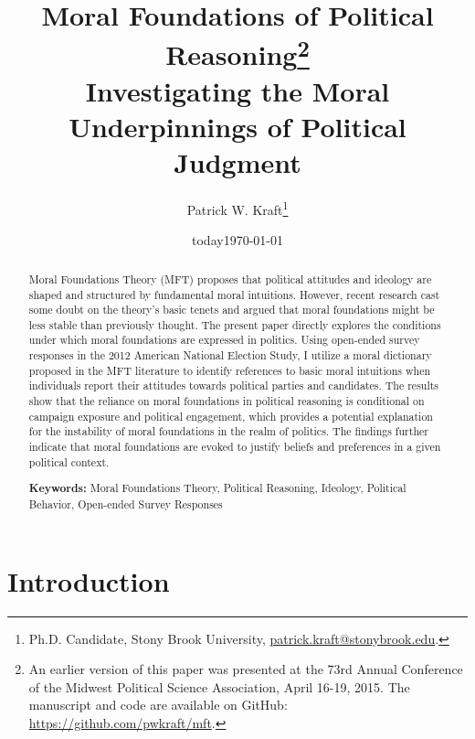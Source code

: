 \documentclass[12pt]{article}
\author{Patrick W. Kraft\footnote{Ph.D. Candidate, Stony Brook University, \href{mailto:patrick.kraft@stonybrook.edu}{patrick.kraft@stonybrook.edu}.
}}
\date{today}
\title{Moral Foundations of Political Reasoning\footnote{An earlier version of this paper was presented at the 73rd Annual Conference of the Midwest Political Science Association, April 16-19, 2015. The manuscript and code are available on GitHub: \url{https://github.com/pwkraft/mft}.}\\
\large{Investigating the Moral Underpinnings of Political Judgment}}
\date{\today}
\begin{document}
\maketitle
\onehalfspacing

\begin{abstract}
Moral Foundations Theory (MFT) proposes that political attitudes and ideology are shaped and structured by fundamental moral intuitions. However, recent research cast some doubt on the theory's basic tenets and argued that moral foundations might be less stable than previously thought. The present paper directly explores the conditions under which moral foundations are expressed in politics. Using open-ended survey responses in the 2012 American National Election Study, I utilize a moral dictionary proposed in the MFT literature to identify references to basic moral intuitions when individuals report their attitudes towards political parties and candidates. The results show that the reliance on moral foundations in political reasoning is conditional on campaign exposure and political engagement, which provides a potential explanation for the instability of moral foundations in the realm of politics. The findings further indicate that moral foundations are evoked to justify beliefs and preferences in a given political context.

\vspace{\baselineskip}
\noindent \textbf{Keywords:} Moral Foundations Theory, Political Reasoning, Ideology, Political Behavior, Open-ended Survey Responses
\end{abstract}
\newpage


\section{Introduction}

\end{document}
